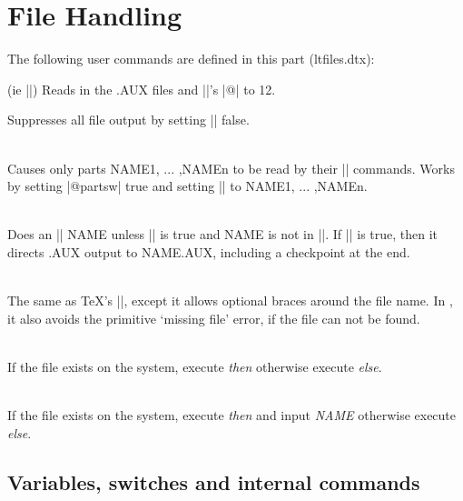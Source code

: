 
 \chapter{File Handling}
\label{ch:ltfiles}
\label{kernel:ltfiles}
 The following user commands are defined in this part (ltfiles.dtx):

   (ie ||)
      Reads in the .AUX files and |\catcode|'s |@| to 12.
  

       Suppresses all file output by setting |\@filesw| false.


  \\
       Causes only parts NAME1, ... ,NAMEn to be read by
         their || commands.  Works by setting |@partsw| true
         and setting |\@partlist| to NAME1, ... ,NAMEn.
  

  \\
        Does an || NAME unless |\@partsw| is true and
         NAME is not in |\@partlist|.  If |\@filesw| is true, then
         it directs .AUX output to NAME.AUX, including a
         checkpoint at the end.
  

 \\
        The same as TeX's ||, except it allows optional
         braces around the file name. In \LaTeXe, it also avoids
         the primitive `missing file' error, if the file can not be
         found.
 

 \\
   If the file exists on the system, execute \emph{then} otherwise
   execute \emph{else}.
 

 \\
   If the file exists on the system, execute \emph{then} and input
   \emph{NAME}  otherwise execute \emph{else}.



\section{Variables, switches and internal commands}

